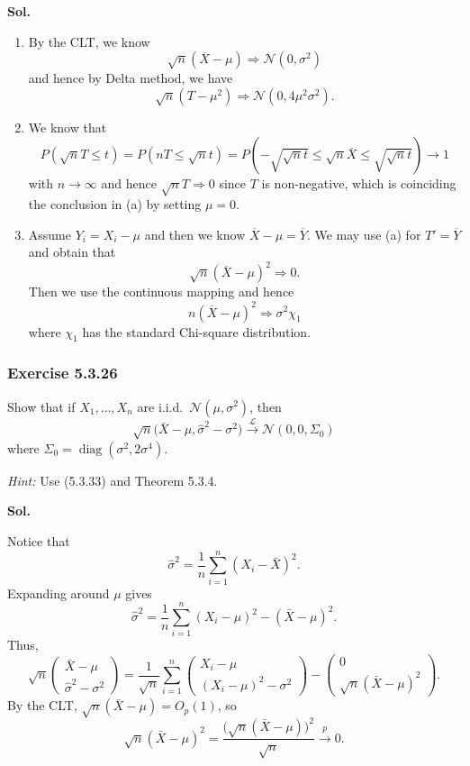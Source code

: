 \documentclass[lang=en,11pt,a4paper,citestyle=authoryear,nobib=true]{elegantpaper}
\begin{document}
\par\vspace{0.5em}\noindent\textbf{Sol.}\par
\begin{enumerate}[label=(\alph*),leftmargin=*]
\item By the CLT, we know
\[
\sqrt{n}(\overline{X} - \mu) \Rightarrow \mathcal{N}(0,\sigma^2)
\]
and hence by Delta method, we have
\[
\sqrt{n}(T - \mu^2) \Rightarrow \mathcal{N}(0,4\mu^2\sigma^2).
\]
\item We know that
\[
P(\sqrt{n}T \leq t) = P(nT \leq \sqrt{n}t) = P(-\sqrt{\sqrt{n}t} \leq \sqrt{n}\overline{X} \leq \sqrt{\sqrt{n}t}) \to 1
\]
with $n \to \infty$ and hence $\sqrt{n}T \Rightarrow 0$ since $T$ is non-negative, which is coinciding the conclusion in (a) by setting $\mu = 0$.
\item Assume $Y_i = X_i - \mu$ and then we know $\overline{X} - \mu = \overline{Y}$. We may use (a) for $T' = \overline{Y}$ and obtain that
\[
\sqrt{n}(\overline{X} - \mu)^2 \Rightarrow 0.
\]
Then we use the continuous mapping and hence
\[
{n}(\overline{X} - \mu)^2 \Rightarrow \sigma^2\chi_1
\]
where $\chi_1$ has the standard Chi-square distribution.
\end{enumerate}

\subsubsection*{Exercise 5.3.26}
Show that if $X_1,\ldots,X_n$ are i.i.d.\ $\mathcal N(\mu,\sigma^2)$, then
\[
\sqrt n\bigl(\bar X-\mu,\widehat\sigma^2-\sigma^2\bigr)
\xrightarrow{\mathcal L}\mathcal N(0,0,\Sigma_0)
\]
where $\Sigma_0=\operatorname{diag}(\sigma^2,2\sigma^4)$.

\noindent\textit{Hint:} Use (5.3.33) and Theorem 5.3.4.

\par\vspace{0.5em}\noindent\textbf{Sol.}\par\vspace{3em}
Notice that
\[
\hat{\sigma}^2 = \frac{1}{n}\sum_{i=1}^n (X_i-\bar X)^2.
\]
Expanding around $\mu$ gives
\[
\hat{\sigma}^2
= \frac{1}{n}\sum_{i=1}^n (X_i-\mu)^2 - (\bar X-\mu)^2.
\]
Thus,
\[
\sqrt n
\begin{pmatrix}
\bar X-\mu\\
\hat{\sigma}^2-\sigma^2
\end{pmatrix}
=
\frac{1}{\sqrt n}\sum_{i=1}^n
\begin{pmatrix}
X_i-\mu\\
(X_i-\mu)^2-\sigma^2
\end{pmatrix}
-
\begin{pmatrix}
0\\
\sqrt n(\bar X-\mu)^2
\end{pmatrix}.
\]
By the CLT, $\sqrt n(\bar X-\mu)=O_p(1)$, so
\[
\sqrt n(\bar X-\mu)^2
= \frac{\bigl(\sqrt n(\bar X-\mu)\bigr)^2}{\sqrt n}
\xrightarrow{p} 0.
\]
\end{document}
